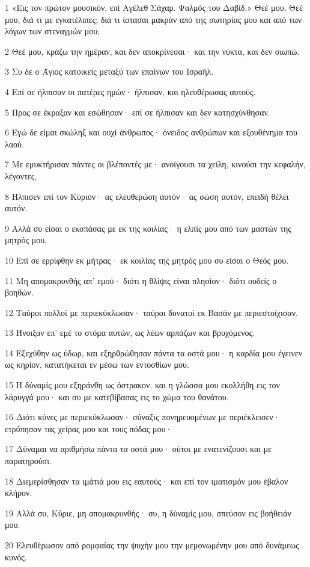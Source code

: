 \par 1 «Εις τον πρώτον μουσικόν, επί Αγέλεθ Σάχαρ. Ψαλμός του Δαβίδ.» Θεέ μου, Θεέ μου, διά τι με εγκατέλιπες; διά τι ίστασαι μακράν από της σωτηρίας μου και από των λόγων των στεναγμών μου;
\par 2 Θεέ μου, κράζω την ημέραν, και δεν αποκρίνεσαι· και την νύκτα, και δεν σιωπώ.
\par 3 Συ δε ο Άγιος κατοικείς μεταξύ των επαίνων του Ισραήλ.
\par 4 Επί σε ήλπισαν οι πατέρες ημών· ήλπισαν, και ηλευθέρωσας αυτούς.
\par 5 Προς σε έκραξαν και εσώθησαν· επί σε ήλπισαν και δεν κατησχύνθησαν.
\par 6 Εγώ δε είμαι σκώληξ και ουχί άνθρωπος· όνειδος ανθρώπων και εξουθένημα του λαού.
\par 7 Με εμυκτήρισαν πάντες οι βλέποντές με· ανοίγουσι τα χείλη, κινούσι την κεφαλήν, λέγοντες,
\par 8 Ήλπισεν επί τον Κύριον· ας ελευθερώση αυτόν· ας σώση αυτόν, επειδή θέλει αυτόν.
\par 9 Αλλά συ είσαι ο εκσπάσας με εκ της κοιλίας· η ελπίς μου από των μαστών της μητρός μου.
\par 10 Επί σε ερρίφθην εκ μήτρας· εκ κοιλίας της μητρός μου συ είσαι ο Θεός μου.
\par 11 Μη απομακρυνθής απ' εμού· διότι η θλίψις είναι πλησίον· διότι ουδείς ο βοηθών.
\par 12 Ταύροι πολλοί με περιεκύκλωσαν· ταύροι δυνατοί εκ Βασάν με περιεστοίχισαν.
\par 13 Ήνοιξαν επ' εμέ το στόμα αυτών, ως λέων αρπάζων και βρυχόμενος.
\par 14 Εξεχύθην ως ύδωρ, και εξηρθρώθησαν πάντα τα οστά μου· η καρδία μου έγεινεν ως κηρίον, κατατήκεται εν μέσω των εντοσθίων μου.
\par 15 Η δύναμίς μου εξηράνθη ως όστρακον, και η γλώσσα μου εκολλήθη εις τον λάρυγγά μου· και συ με κατεβίβασας εις το χώμα του θανάτου.
\par 16 Διότι κύνες με περιεκύκλωσαν· σύναξις πονηρευομένων με περιέκλεισεν· ετρύπησαν τας χείρας μου και τους πόδας μου·
\par 17 Δύναμαι να αριθμήσω πάντα τα οστά μου· ούτοι με ενατενίζουσι και με παρατηρούσι.
\par 18 Διεμερίσθησαν τα ιμάτιά μου εις εαυτούς· και επί τον ιματισμόν μου έβαλον κλήρον.
\par 19 Αλλά συ, Κύριε, μη απομακρυνθής· συ, η δύναμίς μου, σπεύσον εις βοήθειάν μου.
\par 20 Ελευθέρωσον από ρομφαίας την ψυχήν μου την μεμονωμένην μου από δυνάμεως κυνός.
